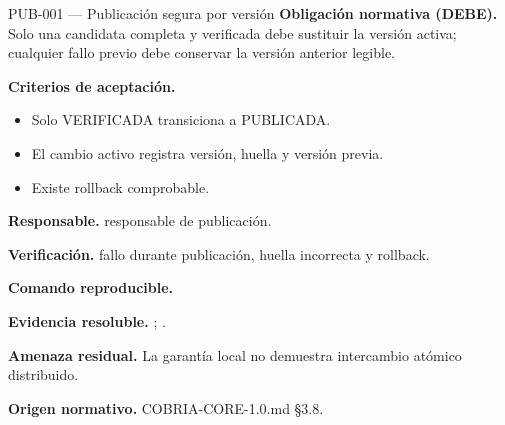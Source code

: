 \begin{requisito}{PUB-001 --- Publicación segura por versión}
\textbf{Obligación normativa (DEBE).} Solo una candidata completa y verificada debe sustituir la versión activa; cualquier fallo previo debe conservar la versión anterior legible.\par
\textbf{Criterios de aceptación.}
\begin{itemize}
\item Solo VERIFICADA transiciona a PUBLICADA.
\item El cambio activo registra versión, huella y versión previa.
\item Existe rollback comprobable.
\end{itemize}
\textbf{Responsable.} responsable de publicación.\par
\textbf{Verificación.} fallo durante publicación, huella incorrecta y rollback.\par
\textbf{Comando reproducible.} \texttt{}\par
\textbf{Evidencia resoluble.} ; .\par
\textbf{Amenaza residual.} La garantía local no demuestra intercambio atómico distribuido.\par
\textbf{Origen normativo.} COBRIA-CORE-1.0.md §3.8.
\end{requisito}
